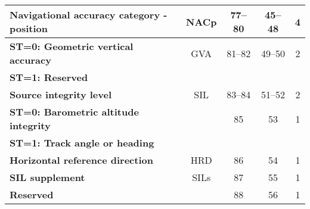 \begin{table}[ht]
\begin{tabular}{|l|c|c|c|c|}
\textbf{Navigational accuracy category - position} & NACp & 77--80 & 45--48 & 4 \\ \hline
\textbf{ST=0: Geometric vertical accuracy} & GVA & 81--82 & 49--50 & 2\\
\textbf{ST=1: Reserved} &&&& \\ \hline
\textbf{Source integrity level} & SIL & 83--84 & 51--52 & 2 \\ \hline
\textbf{ST=0: Barometric altitude integrity} & & 85 & 53 & 1\\
\textbf{ST=1: Track angle or heading} &&&& \\ \hline
\textbf{Horizontal reference direction} & HRD & 86 & 54 & 1 \\ \hline
\textbf{SIL supplement} & SILs & 87 & 55 & 1 \\ \hline
\textbf{Reserved} &  & 88 & 56 & 1 \\ \hline
\end{tabular}
\end{table}
